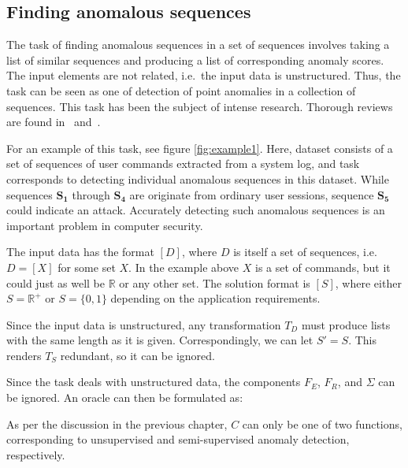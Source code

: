 \subsection{Finding anomalous sequences}

The task of finding anomalous sequences in a set of sequences involves taking a list of similar sequences and producing a list of corresponding anomaly scores. The input elements are not related, i.e.\ the input data is unstructured. Thus, the task can be seen as one of detection of point anomalies in a collection of sequences. This task has been the subject of intense research. Thorough reviews are found in~\cite{chandola2} and~\cite{chandola3}.

For an example of this task, see figure \ref{fig:example1}. Here, dataset consists of a set of sequences of user commands extracted from a system log, and task corresponds to detecting individual anomalous sequences in this dataset. While sequences $\mathbf{S_1}$ through $\mathbf{S_4}$ are originate from ordinary user sessions, sequence $\mathbf{S_5}$ could indicate an attack. Accurately detecting such anomalous sequences is an important problem in computer security.

The input data has the format $[D]$, where $D$ is itself a set of sequences, i.e.\ $D = [X]$ for some set $X$. In the example above $X$ is a set of commands, but it could just as well be $\mathbb{R}$ or any other set. The solution format is $[S]$, where either $S = \mathbb{R}^+$ or $S = \{0, 1\}$ depending on the application requirements.

Since the input data is unstructured, any transformation $T_D$ must produce lists with the same length as it is given. Correspondingly, we can let $S' = S$. This renders $T_S$ redundant, so it can be ignored.

Since the task deals with unstructured data, the components $F_E$, $F_R$, and $\Sigma$ can be ignored. An oracle can then be formulated as:

\begin{algorithmic}
     
    \EndFor{}
\end{algorithmic}

As per the discussion in the previous chapter, $C$ can only be one of two functions, corresponding to unsupervised and semi-supervised anomaly detection, respectively.

